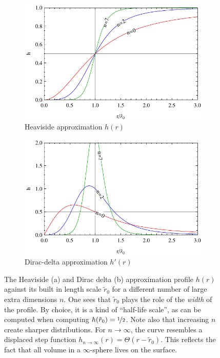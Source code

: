 \documentclass[12pt,a4paper]{report}
\numberwithin{equation}{chapter}
\begin{document}
\begin{figure}[b!]
\centering
\begin{subfigure}{0.5\textwidth}
\caption{Heaviside approximation $h(r)$}
\label{fig:profile-h}%
\includegraphics[width=\textwidth]{figures/profile-h.pdf}
\end{subfigure}%
\begin{subfigure}{0.5\textwidth}
\caption{Dirac-delta approximation $h'(r)$}
\label{fig:apx-dirac-h}%
\includegraphics[width=\textwidth]{figures/dirac-profile-h.pdf}
\end{subfigure}%
\caption[Plots of the holographic function $h(r)$ and its derivative.]{The Heaviside (a) and Dirac delta (b) approximation profile $h(r)$ against its built in length scale $\tilde r_0$ for a different number of large extra dimensions $n$. One sees that $\tilde r_0$ plays the role of the \emph{width} of the profile. By choice, it is a kind of ``half-life scale'', as can be computed when computing $h(\tilde r_0)=\nicefrac 12$. Note also that increasing $n$ create sharper distributions. For $n\to \infty$, the curve resembles a displaced step function $h_{n\to\infty}(r)=\Theta(r-\tilde r_0)$. This reflects the fact that all volume in a $\infty$-sphere lives on the surface.}\label{fig:profiles-h}
\end{figure}
\end{document}
